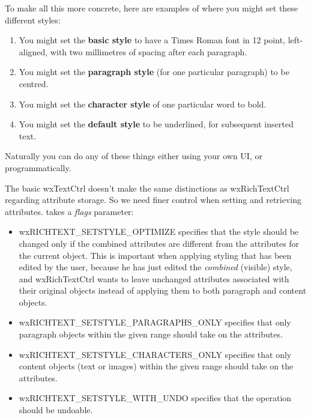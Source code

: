 To make all this more concrete, here are examples of where you might set these different
styles:

\begin{enumerate}\itemsep=0pt
\item You might set the {\bf basic style} to have a Times Roman font in 12 point,
left-aligned, with two millimetres of spacing after each paragraph.
\item You might set the {\bf paragraph style} (for one particular paragraph) to
be centred.
\item You might set the {\bf character style} of one particular word to bold.
\item You might set the {\bf default style} to be underlined, for subsequent
inserted text.
\end{enumerate}

Naturally you can do any of these things either using your own UI, or programmatically.

The basic wxTextCtrl doesn't make the same distinctions as wxRichTextCtrl regarding
attribute storage. So we need finer control when setting and retrieving
attributes.  takes a {\it flags} parameter:

\begin{itemize}\itemsep=0pt
\item wxRICHTEXT\_SETSTYLE\_OPTIMIZE specifies that the style should be changed only if
the combined attributes are different from the attributes for the current object. This is important when
applying styling that has been edited by the user, because he has just edited the {\it combined} (visible)
style, and wxRichTextCtrl wants to leave unchanged attributes associated with their original objects
instead of applying them to both paragraph and content objects.
\item wxRICHTEXT\_SETSTYLE\_PARAGRAPHS\_ONLY specifies that only paragraph objects within the given range
should take on the attributes.
\item wxRICHTEXT\_SETSTYLE\_CHARACTERS\_ONLY specifies that only content objects (text or images) within the given range
should take on the attributes.
\item wxRICHTEXT\_SETSTYLE\_WITH\_UNDO specifies that the operation should be undoable.
\end{itemize}

